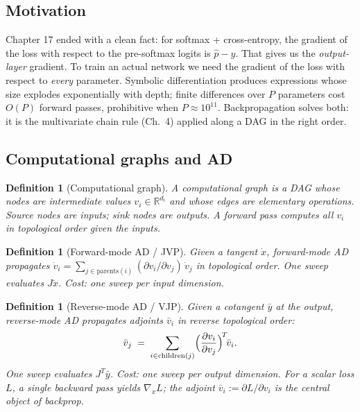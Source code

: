 \documentclass[11pt]{article}
\newtheorem{definition}[theorem]{Definition}
\theoremstyle{remark}
\begin{document}
\subsection*{Motivation}

Chapter 17 ended with a clean fact: for softmax + cross-entropy, the gradient
of the loss with respect to the pre-softmax logits is $\hat p - y$. That gives
us the \emph{output-layer} gradient. To train an actual network we need the
gradient of the loss with respect to \emph{every} parameter. Symbolic
differentiation produces expressions whose size explodes exponentially with
depth; finite differences over $P$ parameters cost $O(P)$ forward passes,
prohibitive when $P\!\approx\!10^{11}$. Backpropagation solves both: it is the
multivariate chain rule (Ch.~4) applied along a DAG in the right order.

\subsection*{Computational graphs and AD}

\begin{definition}[Computational graph]
A \emph{computational graph} is a DAG whose nodes are intermediate values
$v_i\in\mathbb{R}^{d_i}$ and whose edges are elementary operations. Source
nodes are inputs; sink nodes are outputs. A \emph{forward pass} computes
all $v_i$ in topological order given the inputs.
\end{definition}

\begin{definition}[Forward-mode AD / JVP]
Given a tangent $\dot x$, forward-mode AD propagates
$\dot v_i = \sum_{j\in\mathrm{parents}(i)} (\partial v_i/\partial v_j)\,\dot v_j$
in topological order. One sweep evaluates $J\dot x$. Cost: one sweep per
\emph{input} dimension.
\end{definition}

\begin{definition}[Reverse-mode AD / VJP]
Given a cotangent $\bar y$ at the output, reverse-mode AD propagates
\emph{adjoints} $\bar v_i$ in reverse topological order:
\[
  \bar v_j \;=\; \sum_{i\in\mathrm{children}(j)}
   \Bigl(\frac{\partial v_i}{\partial v_j}\Bigr)^{\!T}\!\bar v_i.
\]
One sweep evaluates $J^{T}\bar y$. Cost: one sweep per \emph{output}
dimension. For a scalar loss $L$, a single backward pass yields $\nabla_x L$;
the adjoint $\bar v_i := \partial L/\partial v_i$ is the central object of
backprop.
\end{definition}
\end{document}
